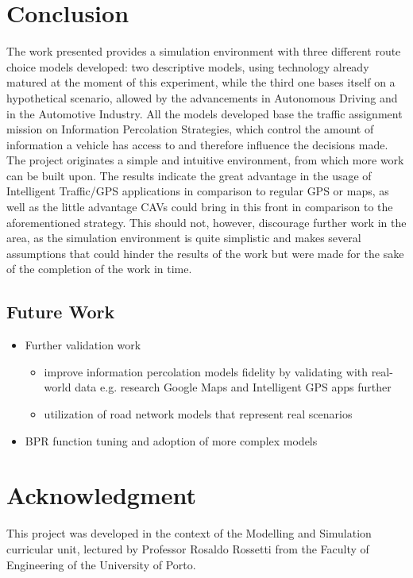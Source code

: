 \section{Conclusion}
\label{sec:Conclusion}

The work presented provides a simulation environment with three different route choice models developed: two descriptive models, using technology already matured at the moment of this experiment, while the third one bases itself on a hypothetical scenario, allowed by the advancements in Autonomous Driving and in the Automotive Industry. All the models developed base the traffic assignment mission on Information Percolation Strategies, which control the amount of information a vehicle has access to and therefore influence the decisions made. The project originates a simple and intuitive environment, from which more work can be built upon. The results indicate the great advantage in the usage of Intelligent Traffic/GPS applications in comparison to regular GPS or maps, as well as the little advantage CAVs could bring in this front in comparison to the aforementioned strategy. This should not, however, discourage further work in the area, as the simulation environment is quite simplistic and makes several assumptions that could hinder the results of the work but were made for the sake of the completion of the work in time.

\subsection{Future Work}

\begin{itemize}
    \item Further validation work
    \begin{itemize}
        \item improve information percolation models fidelity by validating with real-world data e.g. research Google Maps and Intelligent GPS apps further
        \item utilization of road network models that represent real scenarios  
    \end{itemize}
    \item BPR function tuning and adoption of more complex models
\end{itemize}

\section*{Acknowledgment}

This project was developed in the context of the Modelling and Simulation curricular unit, lectured by Professor Rosaldo Rossetti from the Faculty of Engineering of the University of Porto.
